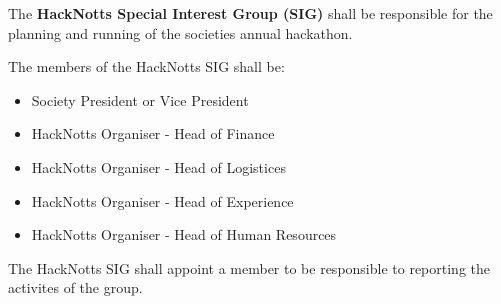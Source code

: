 \begin{clause}
    The \textbf{HackNotts Special Interest Group (SIG)} shall be responsible for the planning and running of the societies annual hackathon.
\end{clause}

\begin{subclause}
    The members of the HackNotts SIG shall be:
    \begin{itemize}[label=--,topsep=0em,itemsep=0em]
        \item Society President or Vice President
        \item HackNotts Organiser - Head of Finance
        \item HackNotts Organiser - Head of Logistices
        \item HackNotts Organiser - Head of Experience
        \item HackNotts Organiser - Head of Human Resources
    \end{itemize}
\end{subclause}

\begin{subclause}
    The HackNotts SIG shall appoint a member to be responsible to reporting the activites of the group.
\end{subclause}